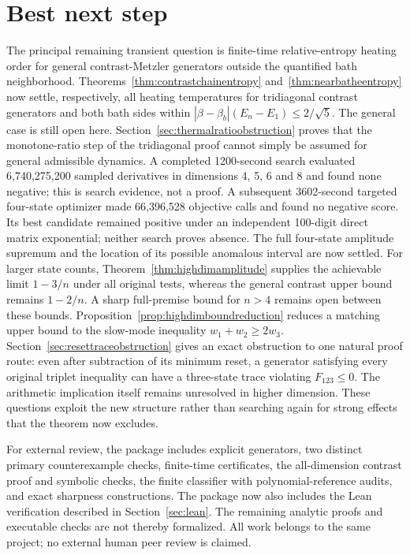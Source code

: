 \documentclass[11pt]{article}
\begin{document}
\section{Best next step}
The principal remaining transient question is finite-time relative-entropy heating order for general contrast-Metzler generators outside the quantified bath neighborhood. Theorems~\ref{thm:contrastchainentropy} and~\ref{thm:nearbatheentropy} now settle, respectively, all heating temperatures for tridiagonal contrast generators and both bath sides within $|\beta-\beta_b|(E_n-E_1)\leq2/\sqrt5$. The general case is still open here. Section~\ref{sec:thermalratioobstruction} proves that the monotone-ratio step of the tridiagonal proof cannot simply be assumed for general admissible dynamics. A completed 1200-second search evaluated 6,740,275,200 sampled derivatives in dimensions 4, 5, 6 and 8 and found none negative; this is search evidence, not a proof. A subsequent 3602-second targeted four-state optimizer made 66,396,528 objective calls and found no negative score. Its best candidate remained positive under an independent 100-digit direct matrix exponential; neither search proves absence. The full four-state amplitude supremum and the location of its possible anomalous interval are now settled. For larger state counts, Theorem~\ref{thm:highdimamplitude} supplies the achievable limit $1-3/n$ under all original tests, whereas the general contrast upper bound remains $1-2/n$. A sharp full-premise bound for $n>4$ remains open between these bounds. Proposition~\ref{prop:highdimboundreduction} reduces a matching upper bound to the slow-mode inequality $w_1+w_2\geq2w_3$. Section~\ref{sec:resettraceobstruction} gives an exact obstruction to one natural proof route: even after subtraction of its minimum reset, a generator satisfying every original triplet inequality can have a three-state trace violating $F_{123}\leq0$. The arithmetic implication itself remains unresolved in higher dimension. These questions exploit the new structure rather than searching again for strong effects that the theorem now excludes.

For external review, the package includes explicit generators, two distinct primary counterexample checks, finite-time certificates, the all-dimension contrast proof and symbolic checks, the finite classifier with polynomial-reference audits, and exact sharpness constructions. The package now also includes the Lean verification described in Section~\ref{sec:lean}. The remaining analytic proofs and executable checks are not thereby formalized. All work belongs to the same project; no external human peer review is claimed.
\end{document}
